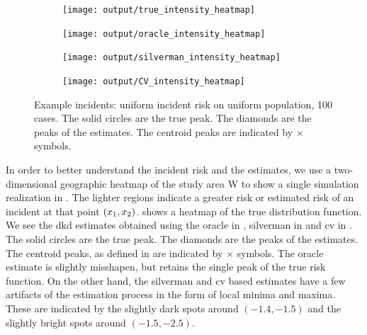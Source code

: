 \begin{figure}[htbp]
    \centering
    \begin{subfigure}[t]{0.45\textwidth}
        \texttt{[image: output/true\_intensity\_heatmap]}
        \label{fig:cases_heatmap:unif_100_1.0_1h:true}
    \end{subfigure}%
    \begin{subfigure}[t]{0.45\textwidth}
        \texttt{[image: output/oracle\_intensity\_heatmap]}
        \label{fig:cases_heatmap:unif_100_1.0_1h:oracle}
    \end{subfigure}

    \begin{subfigure}[b]{0.45\textwidth}
        \texttt{[image: output/silverman\_intensity\_heatmap]}
        \label{fig:cases_heatmap:unif_100_1.0_1h:silverman}
    \end{subfigure}%
    \begin{subfigure}[b]{0.45\textwidth}
        \texttt{[image: output/CV\_intensity\_heatmap]}
        \label{fig:cases_heatmap:unif_100_1.0_1h:cv}
    \end{subfigure}
    \caption[Example incidents: uniform incident risk on uniform population, 100 cases]
        {Example incidents: uniform incident risk on uniform population, 100 cases.
        The solid circles are the true peak.
        The diamonds are the peaks of the estimates.
        The centroid peaks are indicated by $\times$ symbols.}
    \label{fig:cases_heatmap:unif_100_1.0_1h}
\end{figure}

In order to better understand the incident risk and the estimates,
we use a two-dimensional geographic heatmap of the study area \gls{W} to show a single simulation realization in
.
The lighter regions indicate a greater risk or estimated risk of an incident at that point $(x_1, x_2)$.
 shows a heatmap of the true distribution function.
We see the \gls{dkd} estimates obtained using the \gls{oracle} in ,
\gls{silverman} in  and \gls{cv} in .
The solid circles are the true peak.
The diamonds are the peaks of the estimates.
The centroid peaks, as defined in  are indicated by $\times$ symbols.
The \gls{oracle} estimate is slightly misshapen,
but retains the single peak of the true risk function.
On the other hand,
the \gls{silverman} and \gls{cv} based estimates have a few artifacts of the estimation process in the form of local minima and maxima.
These are indicated by the slightly dark spots around $(-1.4, -1.5)$
and the slightly bright spots around $(-1.5, -2.5)$.

